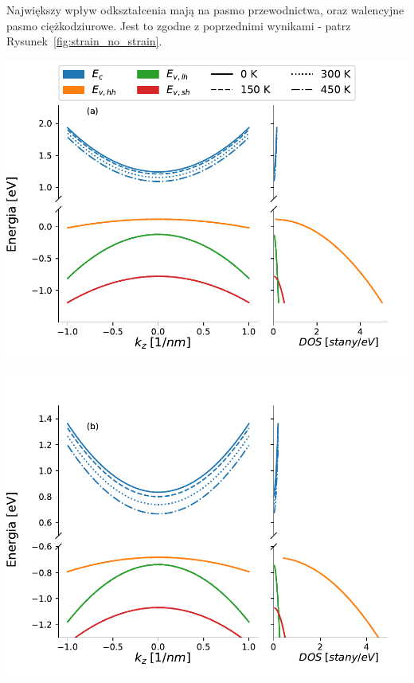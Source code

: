 \documentclass[12pt,openany,a4paper]{book}
\begin{document}
Największy wpływ odkształcenia mają na pasmo przewodnictwa, oraz walencyjne pasmo
ciężkodziurowe. Jest to zgodne z poprzednimi wynikami - patrz Rysunek~\ref{fig:strain_no_strain}.

\begin{minipage}[t]{0.5\textwidth}
	\includegraphics[width = 1.05\linewidth]{Figures/band_str/good/x_0.1_y_0.3.pdf}\label{fig:bs_x_0.1_y_0.3}
\end{minipage}
\begin{minipage}[t]{0.5\textwidth}
	\includegraphics[width = 1.05\linewidth]{Figures/band_str/good/x_0.1_y_0.9.pdf}\label{fig:bs_x_0.1_y_0.9}
\end{minipage}
\end{document}
